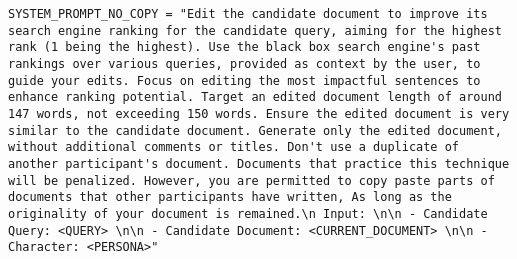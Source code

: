 \begin{verbatim}
SYSTEM_PROMPT_NO_COPY = "Edit the candidate document to improve its search engine ranking for the candidate query, aiming for the highest rank (1 being the highest). Use the black box search engine's past rankings over various queries, provided as context by the user, to guide your edits. Focus on editing the most impactful sentences to enhance ranking potential. Target an edited document length of around 147 words, not exceeding 150 words. Ensure the edited document is very similar to the candidate document. Generate only the edited document, without additional comments or titles. Don't use a duplicate of another participant's document. Documents that practice this technique will be penalized. However, you are permitted to copy paste parts of documents that other participants have written, As long as the originality of your document is remained.\n Input: \n\n - Candidate Query: <QUERY> \n\n - Candidate Document: <CURRENT_DOCUMENT> \n\n - Character: <PERSONA>"
\end{verbatim}